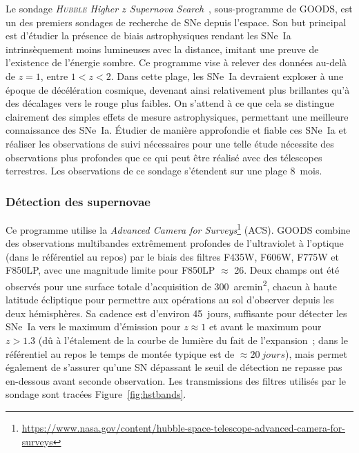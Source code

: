 \documentclass[../main/main.tex]{subfiles}
\begin{document}
Le sondage \textit{\textsc{Hubble} Higher $z$ Supernova
Search}~\citep[HHZSS,][]{strolger2004}, sous-programme de GOODS, est un des
premiers sondages de recherche de SNe depuis l'espace. Son but principal est
d'étudier la présence de biais astrophysiques rendant les SNe~Ia intrinsèquement
moins lumineuses avec la distance, imitant une preuve de l'existence de
l'énergie sombre. Ce programme vise à relever des données au-delà de $z = 1$,
entre $1 < z < 2$. Dans cette plage, les SNe~Ia devraient exploser à une époque
de décélération cosmique, devenant ainsi relativement plus brillantes qu'à des
décalages vers le rouge plus faibles. On s'attend à ce que cela se distingue
clairement des simples effets de mesure astrophysiques, permettant une meilleure
connaissance des SNe~Ia. Étudier de manière approfondie et fiable ces SNe~Ia et
réaliser les observations de suivi nécessaires pour une telle étude nécessite
des observations plus profondes que ce qui peut être réalisé avec des télescopes
terrestres. Les observations de ce sondage s'étendent sur une plage
\SI{8}{mois}.

\subsubsection{Détection des supernovae}\label{sssec:hstdetec}

Ce programme utilise la \textit{Advanced Camera for
Surveys}\footnote{\href{https://www.nasa.gov/content/hubble-space-telescope-advanced-camera-for-surveys}
{https://www.nasa.gov/content/hubble-space-telescope-advanced-camera-for-surveys}}
(ACS). GOODS combine des observations multibandes extrêmement profondes de
l'ultraviolet à l'optique (dans le référentiel au repos) par le biais des
filtres F435W, F606W, F775W et F850LP, avec une magnitude limite pour F850LP
$\approx$ 26. Deux champs ont été observés pour une
surface totale d'acquisition de \SI{300}{arcmin^2}, chacun à haute latitude
écliptique pour permettre aux opérations au sol d'observer depuis les deux
hémisphères. Sa cadence est d'environ \SI{45}{jours}, suffisante pour détecter
les SNe~Ia vers le maximum d'émission pour $z \approx 1$ et avant le maximum
pour $z > 1.3$ (dû à l'étalement de la courbe de lumière du fait de
l'expansion~; dans le référentiel au repos le temps de montée typique est de
$\approx \SI{20}{jours}$), mais permet également de s'assurer qu'une SN
dépassant le seuil de détection ne repasse pas en-dessous avant seconde
observation. Les transmissions des filtres utilisés par le sondage sont tracées
Figure~\ref{fig:hstbands}.
\end{document}
